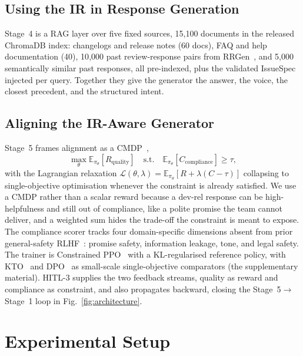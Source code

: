 \documentclass[preprint,12pt]{elsarticle}
\begin{document}
\subsection{Using the IR in Response Generation}\label{aim2}

Stage~4 is a RAG layer over five fixed sources, 15{,}100 documents in the released ChromaDB
index: changelogs and release notes (60 docs), FAQ and help documentation (40), 10{,}000 past
review-response pairs from RRGen~\cite{gao2019automating}, and 5{,}000 semantically similar past
responses, all pre-indexed, plus the validated IssueSpec injected per query. Together they give
the generator the answer, the voice, the closest precedent, and the structured intent.

\subsection{Aligning the IR-Aware Generator}\label{aim3}

Stage~5 frames alignment as a CMDP~\cite{altman2021constrained, dai2024safe},
  \[
  \max_\theta \mathbb{E}_{\pi_\theta}[R_{\text{quality}}] \quad
  \text{s.t.} \quad \mathbb{E}_{\pi_\theta}[C_{\text{compliance}}] \ge \tau,
  \]
  with the Lagrangian relaxation
  $\mathcal{L}(\theta,\lambda) = \mathbb{E}_{\pi_\theta}[R + \lambda(C - \tau)]$
  collapsing to single-objective optimisation whenever the constraint is already satisfied. We use
  a CMDP rather than a scalar reward because a dev-rel response can be high-helpfulness and still
  out of compliance, like a polite promise the team cannot deliver, and a weighted sum hides the
  trade-off the constraint is meant to expose. The compliance scorer tracks four domain-specific
  dimensions absent from prior general-safety RLHF~\cite{dai2024safe}: promise safety, information
  leakage, tone, and legal safety. The trainer is Constrained PPO~\cite{schulman2017proximal} with
  a KL-regularised reference policy, with KTO~\cite{ethayarajh2024kto} and
  DPO~\cite{rafailov2023direct} as small-scale single-objective comparators
  (the supplementary material). HITL-3 supplies the two feedback streams, quality as reward
  and compliance as constraint, and also propagates backward, closing the Stage~5$\to$Stage~1 loop
  in Fig.~\ref{fig:architecture}.
\section{Experimental Setup}\label{experiments}
\end{document}
